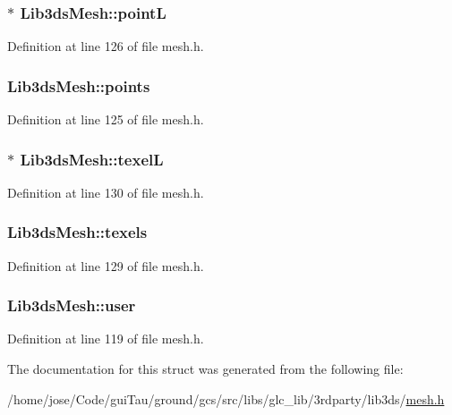 \hypertarget{struct_lib3ds_mesh_aa1c06370102a3788f92e41857d94b614}{
\subsubsection[{point\-L}]{$\ast$ Lib3ds\-Mesh\-::point\-L}}\label{struct_lib3ds_mesh_aa1c06370102a3788f92e41857d94b614}


Definition at line 126 of file mesh.\-h.

\hypertarget{struct_lib3ds_mesh_a55e11a6fdf1a89dbff135f529238b0b0}{
\subsubsection[{points}]{ Lib3ds\-Mesh\-::points}}\label{struct_lib3ds_mesh_a55e11a6fdf1a89dbff135f529238b0b0}


Definition at line 125 of file mesh.\-h.

\hypertarget{struct_lib3ds_mesh_a7f25b8f21a652c686feaff0f31c2ad64}{
\subsubsection[{texel\-L}]{$\ast$ Lib3ds\-Mesh\-::texel\-L}}\label{struct_lib3ds_mesh_a7f25b8f21a652c686feaff0f31c2ad64}


Definition at line 130 of file mesh.\-h.

\hypertarget{struct_lib3ds_mesh_afa402f2017ea15f2049445ee41d92036}{
\subsubsection[{texels}]{ Lib3ds\-Mesh\-::texels}}\label{struct_lib3ds_mesh_afa402f2017ea15f2049445ee41d92036}


Definition at line 129 of file mesh.\-h.

\hypertarget{struct_lib3ds_mesh_ae0517a931b1c83f1229a547aecbede5f}{
\subsubsection[{user}]{ Lib3ds\-Mesh\-::user}}\label{struct_lib3ds_mesh_ae0517a931b1c83f1229a547aecbede5f}


Definition at line 119 of file mesh.\-h.



The documentation for this struct was generated from the following file\-:\begin{DoxyCompactItemize}
\item 
/home/jose/\-Code/gui\-Tau/ground/gcs/src/libs/glc\-\_\-lib/3rdparty/lib3ds/\hyperlink{mesh_8h}{mesh.\-h}\end{DoxyCompactItemize}
